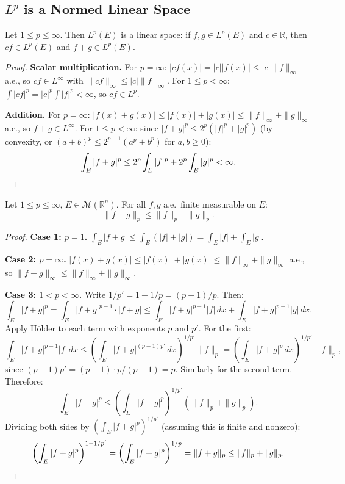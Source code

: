\documentclass[11pt]{report}
\begin{document}
\subsection{$L^p$ is a Normed Linear Space}

\begin{propbox}
Let $1 \leq p \leq \infty$. Then $L^p(E)$ is a linear space: if $f, g \in L^p(E)$ and $c \in \mathbb{R}$, then $cf \in L^p(E)$ and $f + g \in L^p(E)$.
\end{propbox}

\begin{proof}\leavevmode

\textbf{Scalar multiplication.} For $p = \infty$: $|cf(x)| = |c||f(x)| \leq |c|\|f\|_\infty$ a.e., so $cf \in L^\infty$ with $\|cf\|_\infty \leq |c|\|f\|_\infty$. For $1 \leq p < \infty$: $\int |cf|^p = |c|^p \int |f|^p < \infty$, so $cf \in L^p$.

\textbf{Addition.} For $p = \infty$: $|f(x) + g(x)| \leq |f(x)| + |g(x)| \leq \|f\|_\infty + \|g\|_\infty$ a.e., so $f + g \in L^\infty$. For $1 \leq p < \infty$: since $|f + g|^p \leq 2^p(|f|^p + |g|^p)$ (by convexity, or $(a + b)^p \leq 2^{p-1}(a^p + b^p)$ for $a, b \geq 0$):
\[
\int_E |f + g|^p \leq 2^p \int_E |f|^p + 2^p \int_E |g|^p < \infty. \qedhere
\]
\end{proof}

\begin{thmbox}
Let $1 \leq p \leq \infty$, $E \in \mathcal{M}(\mathbb{R}^n)$. For all $f, g$ a.e.\ finite measurable on $E$:
\[
\|f + g\|_p \leq \|f\|_p + \|g\|_p.
\]
\end{thmbox}

\begin{proof}\leavevmode

\textbf{Case 1: $p = 1$.} $\int_E |f + g| \leq \int_E (|f| + |g|) = \int_E |f| + \int_E |g|$. \checkmark

\textbf{Case 2: $p = \infty$.} $|f(x) + g(x)| \leq |f(x)| + |g(x)| \leq \|f\|_\infty + \|g\|_\infty$ a.e., so $\|f + g\|_\infty \leq \|f\|_\infty + \|g\|_\infty$. \checkmark

\textbf{Case 3: $1 < p < \infty$.} Write $1/p' = 1 - 1/p = (p-1)/p$. Then:
\[
\int_E |f + g|^p = \int_E |f + g|^{p-1} \cdot |f + g| \leq \int_E |f + g|^{p-1}|f|\,dx + \int_E |f + g|^{p-1}|g|\,dx.
\]
Apply H\"older to each term with exponents $p$ and $p'$. For the first:
\[
\int_E |f + g|^{p-1}|f|\,dx \leq \left(\int_E |f + g|^{(p-1)p'}\,dx\right)^{1/p'} \|f\|_p = \left(\int_E |f + g|^p\,dx\right)^{1/p'} \|f\|_p,
\]
since $(p-1)p' = (p-1) \cdot p/(p-1) = p$. Similarly for the second term. Therefore:
\[
\int_E |f + g|^p \leq \left(\int_E |f + g|^p\right)^{1/p'} (\|f\|_p + \|g\|_p).
\]
Dividing both sides by $(\int_E |f + g|^p)^{1/p'}$ (assuming this is finite and nonzero):
\[
\left(\int_E |f + g|^p\right)^{1 - 1/p'} = \left(\int_E |f + g|^p\right)^{1/p} = \|f + g\|_p \leq \|f\|_p + \|g\|_p. \qedhere
\]
\end{proof}
\end{document}
